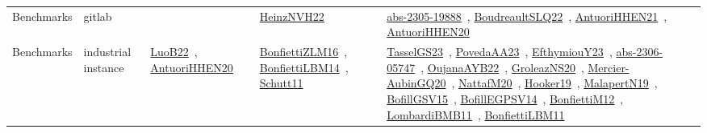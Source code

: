 {\begin{longtable}{lp{3cm}>{\raggedright\arraybackslash}p{6cm}>{\raggedright\arraybackslash}p{6cm}>{\raggedright\arraybackslash}p{8cm}}
Benchmarks & gitlab &  & \href{../works/HeinzNVH22.pdf}{HeinzNVH22}~\cite{HeinzNVH22} & \href{../works/abs-2305-19888.pdf}{abs-2305-19888}~\cite{abs-2305-19888}, \href{../works/BoudreaultSLQ22.pdf}{BoudreaultSLQ22}~\cite{BoudreaultSLQ22}, \href{../works/AntuoriHHEN21.pdf}{AntuoriHHEN21}~\cite{AntuoriHHEN21}, \href{../works/AntuoriHHEN20.pdf}{AntuoriHHEN20}~\cite{AntuoriHHEN20}\\
Benchmarks & industrial instance & \href{../works/LuoB22.pdf}{LuoB22}~\cite{LuoB22}, \href{../works/AntuoriHHEN20.pdf}{AntuoriHHEN20}~\cite{AntuoriHHEN20} & \href{../works/BonfiettiZLM16.pdf}{BonfiettiZLM16}~\cite{BonfiettiZLM16}, \href{../works/BonfiettiLBM14.pdf}{BonfiettiLBM14}~\cite{BonfiettiLBM14}, \href{../works/Schutt11.pdf}{Schutt11}~\cite{Schutt11} & \href{../works/TasselGS23.pdf}{TasselGS23}~\cite{TasselGS23}, \href{../works/PovedaAA23.pdf}{PovedaAA23}~\cite{PovedaAA23}, \href{../works/EfthymiouY23.pdf}{EfthymiouY23}~\cite{EfthymiouY23}, \href{../works/abs-2306-05747.pdf}{abs-2306-05747}~\cite{abs-2306-05747}, \href{../works/OujanaAYB22.pdf}{OujanaAYB22}~\cite{OujanaAYB22}, \href{../works/GroleazNS20.pdf}{GroleazNS20}~\cite{GroleazNS20}, \href{../works/Mercier-AubinGQ20.pdf}{Mercier-AubinGQ20}~\cite{Mercier-AubinGQ20}, \href{../works/NattafM20.pdf}{NattafM20}~\cite{NattafM20}, \href{../works/Hooker19.pdf}{Hooker19}~\cite{Hooker19}, \href{../works/MalapertN19.pdf}{MalapertN19}~\cite{MalapertN19}, \href{../works/BofillGSV15.pdf}{BofillGSV15}~\cite{BofillGSV15}, \href{../works/BofillEGPSV14.pdf}{BofillEGPSV14}~\cite{BofillEGPSV14}, \href{../works/BonfiettiM12.pdf}{BonfiettiM12}~\cite{BonfiettiM12}, \href{../works/LombardiBMB11.pdf}{LombardiBMB11}~\cite{LombardiBMB11}, \href{../works/BonfiettiLBM11.pdf}{BonfiettiLBM11}~\cite{BonfiettiLBM11}\\

\end{longtable}}
